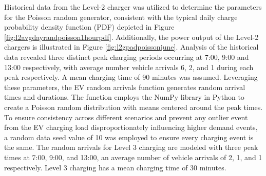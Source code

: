 \documentclass[conference]{IEEEtran}
\begin{document}
	Historical data from the Level-2 charger was utilized to determine the parameters for the Poisson random generator, consistent with the typical daily charge probability density function (PDF) depicted in Figure \ref{fig:l2avgdayrandpoisson1hourpdf}. Additionally, the power output of the Level-2 chargers is illustrated in Figure \ref{fig:l2gpadpoissonjune}. Analysis of the historical data revealed three distinct peak charging periods occurring at 7:00, 9:00 and  13:00 respectively, with average number vehicle arrivals 6, 2, and 1 during each peak respectively. A mean charging time of 90 minutes was assumed. Leveraging these parameters, the EV random arrivals function generates random arrival times and durations. The function employs the NumPy library in Python to create a Poisson random distribution with means centered around the peak times. To ensure consistency across different scenarios and prevent any outlier event from the EV charging load disproportionately influencing higher demand events, a random data seed value of 10 was employed to ensure every charging event is the same. The random arrivals for Level 3 charging are modeled with three peak times at 7:00, 9:00, and 13:00, an average number of vehicle arrivals of 2, 1,  and 1  respectively. Level 3 charging has a mean charging time of 30 minutes.
\end{document}
